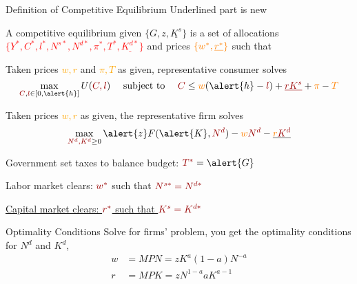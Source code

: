 \documentclass[11pt,aspectratio=169,usenames,dvipsnames]{beamer}
\newcommand{\orange}[1]{\textcolor{orange}{#1}}
\newcommand{\red}[1]{\textcolor{red}{#1}}
\let\tempa\enumerate
\let\tempb\endenumerate
\renewenvironment{enumerate}{\tempa\addtolength{\itemsep}{\fill}}{\tempb}
\begin{document}
\begin{frame}{Definition of Competitive Equilibrium}
\label{slide:Definition_of_Competitive_Equilibrium}
    Underlined part is new

    A \alert{competitive equilibrium} given \alert{$ \{ G, z, \underline{K^{s}} \} $} is a set of allocations \red{$ \{ Y^{*}, C^{*}, l^{*}, N^{s*}, N^{d*}, \pi^{*}, T^{*}, \underline{K^{d*}} \}$} and prices $ \orange{\{ w^{*}, \underline{r^{*}} \}} $ such that
    \begin{enumerate}
        \item Taken prices \orange{$w, r$} and \orange{$\pi, T$} as given, representative consumer solves
        \begin{equation}
        \label{eq:consumer_problem}
            \max_{\red{C}, \red{l} \in [ 0, \alert{h} ]} U( \red{C, l} ) \quad \text{ subject to } \quad \red{C} \le \orange{w} ( \alert{h} - \red{l} ) + \red{\underline{r K^{s}}} + \orange{\pi} - \orange{T}
        \end{equation}
        \item Taken prices \orange{$w, r$} as given, the representative firm solves
        \begin{equation}
        \label{eq:firm_problem}
            \max_{\red{N^{d}, K^{d}} \ge 0} \alert{z} F( \alert{K}, \red{N^{d}} ) - \orange{w} \red{N^{d}} - \underline{\orange{r} \red{K^{d}}}
        \end{equation}
        \item Government set taxes to balance budget: $ \red{T^{*}} = \alert{G} $
        \item Labor market clears: $ \red{w^{*}} $ such that $ \red{N^{s*} = N^{d*}} $
        \item \underline{Capital market clears: $ \red{r^{*}} $ such that $ \red{K^{s} = K^{d*}} $}
    \end{enumerate}
\end{frame}

\begin{frame}{Optimality Conditions}
\label{slide:Optimality_Conditions}
    Solve for firms' problem, you get the optimality conditions for $ N^{d} $ and $ K^{d} $,
    \begin{align}
        w
            & = MPN = z K^{a} (1 - a) N^{-a}
        \\
        r
            & = MPK = z N^{1-a} a K^{a-1}
    \end{align}

\end{frame}
\end{document}
